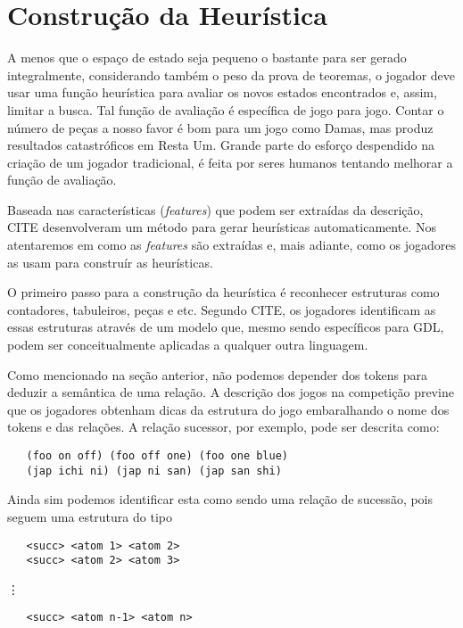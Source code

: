 \section{Construção da Heurística}
A menos que o espaço de estado seja pequeno o bastante para ser gerado
integralmente, considerando também o peso da prova de teoremas, o jogador deve
usar uma função heurística para avaliar os novos estados encontrados e, assim,
limitar a busca. Tal função de avaliação é específica de jogo para jogo. Contar
o número de peças a nosso favor é bom para um jogo como Damas, mas produz
resultados catastróficos em Resta Um. Grande parte do esforço despendido na
criação de um jogador tradicional, é feita por seres humanos tentando melhorar a
função de avaliação.

Baseada nas características ({\it features}) que podem ser extraídas da
descrição, CITE desenvolveram
um método para gerar heurísticas automaticamente. Nos atentaremos em como as
{\it features} são extraídas e, mais adiante, como os jogadores as usam para
construír as heurísticas.

O primeiro passo para a construção da heurística é reconhecer estruturas como
contadores, tabuleiros, peças e etc. Segundo CITE, os jogadores identificam as
essas estruturas através de um modelo que, mesmo sendo específicos para GDL,
podem ser conceitualmente aplicadas a qualquer outra linguagem. 

Como mencionado na seção anterior, não podemos depender dos tokens para deduzir
a semântica de uma relação. A descrição dos jogos na competição previne que os
jogadores obtenham dicas da estrutura do jogo embaralhando o nome dos tokens e
das relações. A relação sucessor, por exemplo, pode ser descrita como:  
\begin{verbatim}
   (foo on off) (foo off one) (foo one blue)
   (jap ichi ni) (jap ni san) (jap san shi)
\end{verbatim}
Ainda sim podemos identificar esta como sendo uma relação de sucessão, pois
seguem uma estrutura do tipo
\begin{verbatim}
   <succ> <atom 1> <atom 2>
   <succ> <atom 2> <atom 3>
\end{verbatim}
\hspace{2cm} \vdots
\begin{verbatim}
   <succ> <atom n-1> <atom n>   
\end{verbatim}
